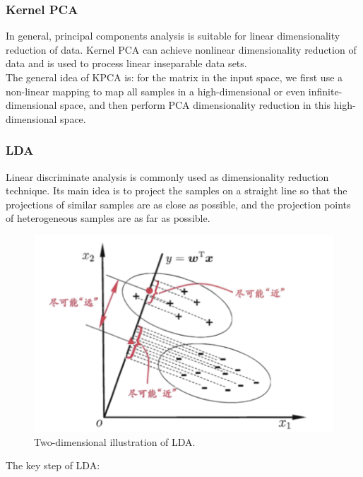 \documentclass{article}
\begin{document}
\subsubsection{Kernel PCA}
\indent In general, principal components analysis is suitable for linear dimensionality reduction of data. Kernel PCA can achieve nonlinear dimensionality reduction of data and is used to process linear inseparable data sets.\\
\indent The general idea of KPCA is: for the matrix in the input space, we first use a non-linear mapping to map all samples in a high-dimensional or even infinite-dimensional space, and then perform PCA dimensionality reduction in this high-dimensional space.
\subsubsection{LDA}
\indent Linear discriminate analysis is commonly used as dimensionality reduction technique. Its main idea is to project the samples on a straight line so that the projections of similar samples are as close as possible, and the projection points of heterogeneous samples are as far as possible. 
	\begin{figure}[htbp]
		\centering
		\includegraphics[scale=0.3]{figure/LDA.png}
		\caption{Two-dimensional illustration of LDA.}
		\label{fig:LDA}
	\end{figure}\cite{zhihuazhou2016ml}\par
\indent The key step of LDA:
\end{document}
